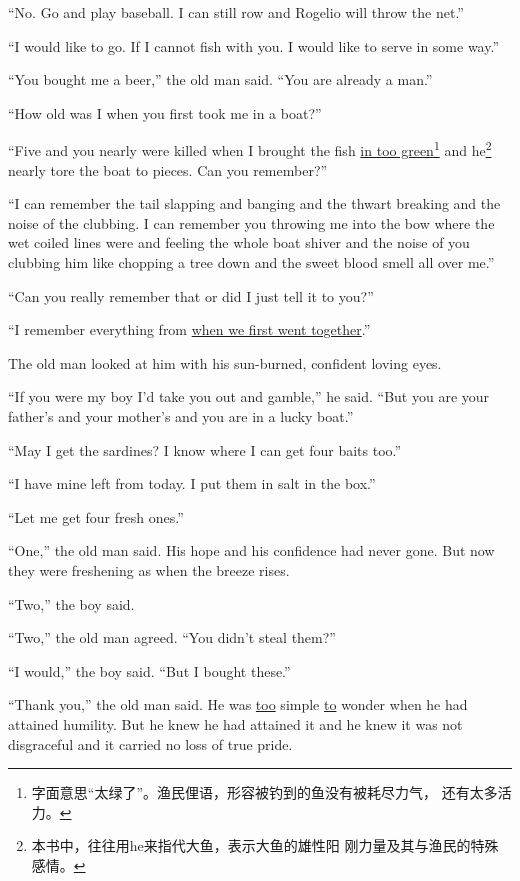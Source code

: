 \documentclass[fontset=ubuntu]{ctexrep}
\begin{document}
``No. Go and play baseball. I can \gls{still} \gls{row} and Rogelio will \gls{throw} the net.''

``I would like to go. If I cannot fish with you. I would like to \gls{serve} in some way.''

``You bought me a beer,'' the old man said. ``You are already a man.''

``How old was I when you first took me in a boat?''

``Five and you nearly were killed when I brought the fish \uline{in too
  green}\footnote{字面意思“太绿了”。渔民俚语，形容被钓到的鱼没有被耗尽力气，
  还有太多活力。} and he\footnote{本书中，往往用he来指代大鱼，表示大鱼的雄性阳
  刚力量及其与渔民的特殊感情。} nearly \gls{tore} the boat to pieces. Can
you remember?''

``I can remember the tail \gls{slapping} and \gls{banging} and the \gls{thwart}
breaking and the noise of the \gls{clubbing}. I can remember you throwing me into
the \gls{bow} where the wet coiled lines were and feeling the whole boat \gls{shiver}
and the noise of you \gls{clubbing} him like \gls{chopping} a tree down and the \gls{sweet}
blood smell all \gls{over} me.''

``Can you really remember that or did I just tell it to you?''

``I remember everything from \uline{when we first went together}.''

The old man looked at him with his sun-burned, \gls{confident} loving eyes.

``If you were my boy I'd take you out and \gls{gamble},'' he said. ``But you are your father's and your mother's and you are in a lucky boat.''

``May I get the sardines? I know where I can get four \glspl{bait} too.''

``I have mine left from today. I put them in salt in the box.''

``Let me get four fresh ones.''

``One,'' the old man said. His hope and his \gls{confidence} had never gone. But now they were \gls{freshening} as when the \gls{breeze} \glspl{rise}.

``Two,'' the boy said.

``Two,'' the old man agreed. ``You didn't \gls{steal} them?''

``I would,'' the boy said. ``But I bought these.''

``Thank you,'' the old man said. He was \uline{too} simple \uline{to}
\gls{wonder} when he had \gls{attained} \gls{humility}. But he knew he had
attained it and he knew it was not \gls{disgraceful} and it carried no loss
of true \gls{pride}.
\end{document}
